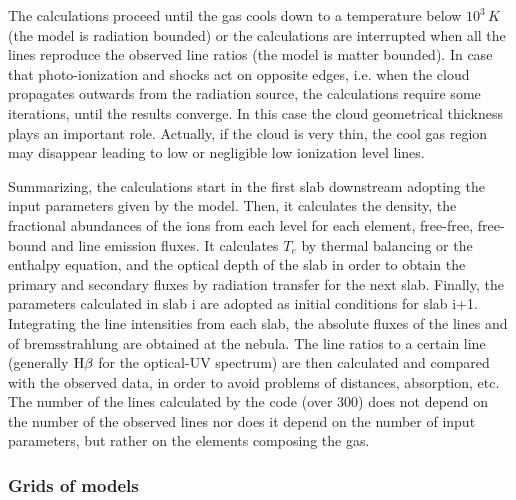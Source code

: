 \documentclass[../thesis.tex]{subfiles}
\begin{document}
The calculations proceed until the gas cools down to a temperature below $10^3\,\si{K}$ (the model is radiation bounded) or the calculations are interrupted when all the lines reproduce the observed line ratios (the model is matter bounded).
In case that photo-ionization and shocks act on opposite edges, i.e. when the cloud propagates outwards from the 
radiation source, the calculations require some iterations, until the results converge.
In this case  the cloud geometrical thickness plays an important role.  
Actually, if the cloud is very thin, the cool gas region may disappear leading to low or negligible low ionization level lines. 

Summarizing, the calculations start in the first slab downstream adopting the input parameters  given by the model.
Then, it calculates the density, the fractional abundances of the ions from each level for each element, free-free,  free-bound  and line emission fluxes. 
It calculates $T_e$ by thermal balancing or the enthalpy equation, and the optical depth of the slab  in order to obtain the primary and secondary fluxes by radiation transfer for the next slab. 
Finally,  the parameters  calculated in slab i are adopted as initial conditions for slab i+1. 
Integrating the line intensities from each slab, the absolute fluxes of the lines and of bremsstrahlung are obtained at the nebula. 
The line ratios to a certain line (generally $\rm H\beta$ for the optical-UV spectrum) are then calculated and compared with the observed data, in order to avoid problems of distances, absorption, etc.
The number of the lines calculated by the code (over 300) does not depend on the number of
the observed lines nor does it depend on the number of  input parameters,
but rather on the elements composing the gas.

\subsubsection{Grids of models}
\end{document}
